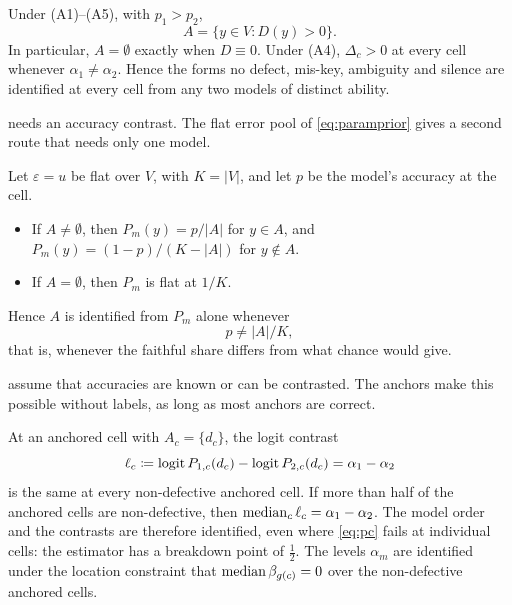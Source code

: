 \begin{theorem}
\label{thm:t2}
Under (A1)--(A5), with $p_1>p_2$,
\begin{equation}
\label{eq:t2}
A=\{y\in V:D(y)>0\}.
\end{equation}
In particular, $A=\emptyset$ exactly when $D\equiv0$. Under (A4), $\Delta_c>0$ at every cell whenever $\alpha_1\neq\alpha_2$. Hence the forms no defect, mis-key, ambiguity and silence are identified at every cell from any two models of distinct ability.
\end{theorem}

 needs an accuracy contrast. The flat error pool of \cref{eq:paramprior} gives a second route that needs only one model.

\begin{theorem}
\label{thm:t2prime}
Let $\varepsilon=u$ be flat over $V$, with $K=|V|$, and let $p$ be the model's accuracy at the cell.
\begin{itemize}[leftmargin=*]
\item If $A\neq\emptyset$, then $P_m(y)=p/|A|$ for $y\in A$, and $P_m(y)=(1-p)/(K-|A|)$ for $y\notin A$.
\item If $A=\emptyset$, then $P_m$ is flat at $1/K$.
\end{itemize}
Hence $A$ is identified from $P_m$ alone whenever
\begin{equation}
\label{eq:t2prime}
p\neq|A|/K,
\end{equation}
that is, whenever the faithful share differs from what chance would give.
\end{theorem}

 assume that accuracies are known or can be contrasted. The anchors make this possible without labels, as long as most anchors are correct.

\begin{theorem}
\label{thm:t3}
At an anchored cell with $A_c=\{d_c\}$, the logit contrast
\begin{equation}
\label{eq:t3}
\ell_c\coloneqq\operatorname{logit} P_{1,c}(d_c)-\operatorname{logit} P_{2,c}(d_c)=\alpha_1-\alpha_2
\end{equation}
is the same at every non-defective anchored cell. If more than half of the anchored cells are non-defective, then $\operatorname*{median}_c\ell_c=\alpha_1-\alpha_2$. The model order and the contrasts are therefore identified, even where \eqref{eq:pc} fails at individual cells: the estimator has a breakdown point of $\tfrac12$. The levels $\alpha_m$ are identified under the location constraint that $\operatorname*{median}\beta_{g(c)}=0$ over the non-defective anchored cells.
\end{theorem}

